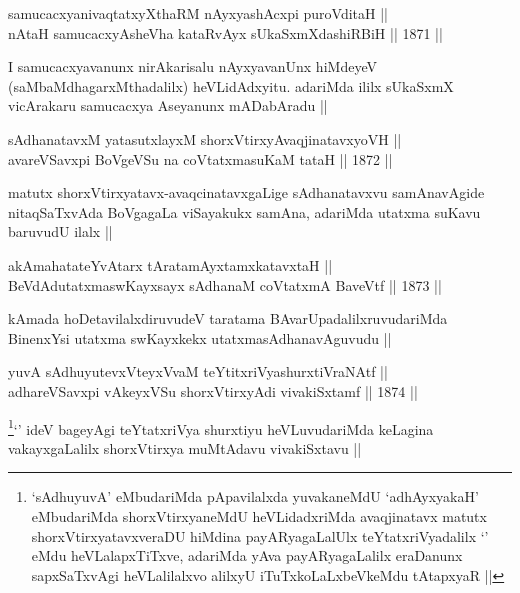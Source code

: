 \begin{shl}
samucacxyanivaqtatxyXthaRM nAyxyashAcxpi puroVditaH || \\
nAtaH samucacxyAsheVha kataRvAyx sUkaSxmXdashiRBiH ||  1871 ||  
\end{shl}

\begin{artha}
I samucacxyavanunx nirAkarisalu nAyxyavanUnx hiMdeyeV
(saMbaMdhagarxMthadalilx) heVLidAdxyitu. adariMda ililx sUkaSxmX
vicArakaru samucacxya Aseyanunx mADabAradu ||
\end{artha}

\begin{shl}
sAdhanatavxM yatasutxlayxM shorxVtirxyAvaqjinatavxyoVH || \\
avareVSavxpi BoVgeVSu na coVtatxmasuKaM tataH ||  1872 ||  
\end{shl}

\begin{artha}
matutx shorxVtirxyatavx-avaqcinatavxgaLige sAdhanatavxvu samAnavAgide
nitaqSaTxvAda BoVgagaLa viSayakukx samAna, adariMda utatxma suKavu
baruvudU ilalx ||
\end{artha}

\begin{shl}
akAmahatateYvAtarx tAratamAyxtamxkatavxtaH || \\
BeVdAdutatxmaswKayxsayx sAdhanaM coVtatxmA BaveVtf ||  1873 ||  
\end{shl}

\begin{artha}
kAmada hoDetavilalxdiruvudeV taratama BAvarUpadalilxruvudariMda
BinenxYsi utatxma swKayxkekx utatxmasAdhanavAguvudu ||
\end{artha}

\begin{shl}
yuvA sAdhuyutevxVteyxVvaM teYtitxriVyashurxtiVraNAtf || \\
adhareVSavxpi vAkeyxVSu shorxVtirxyAdi vivakiSxtamf ||  1874 ||  
\end{shl}

\begin{artha}
\footnote[1]{`sAdhuyuvA' eMbudariMda pApavilalxda yuvakaneMdU
  `adhAyxyakaH' eMbudariMda shorxVtirxyaneMdU heVLidadxriMda
  avaqjinatavx matutx shorxVtirxyatavxveraDU hiMdina payARyagaLalUlx
  teYtatxriVyadalilx `\stext' eMdu heVLalapxTiTxve, adariMda yAva
  payARyagaLalilx eraDanunx sapxSaTxvAgi heVLalilalxvo alilxyU
  iTuTxkoLaLxbeVkeMdu tAtapxyaR ||}`\stext' ideV bageyAgi teYtatxriVya shurxtiyu
heVLuvudariMda keLagina vakayxgaLalilx shorxVtirxya muMtAdavu
vivakiSxtavu ||
\end{artha}

